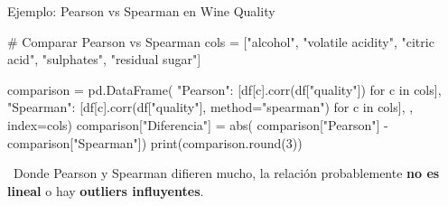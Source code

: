 \documentclass[aspectratio=169, 11pt]{beamer}
\begin{document}
\begin{frame}[fragile,shrink=28]{Ejemplo: Pearson vs Spearman en Wine Quality}
  \vspace{-6pt}
  \begin{pyblock}
# Comparar Pearson vs Spearman
cols = ["alcohol", "volatile acidity", "citric acid",
        "sulphates", "residual sugar"]

comparison = pd.DataFrame({
    "Pearson": [df[c].corr(df["quality"]) for c in cols],
    "Spearman": [df[c].corr(df["quality"],
                 method="spearman") for c in cols],
}, index=cols)
comparison["Diferencia"] = abs(
    comparison["Pearson"] - comparison["Spearman"])
print(comparison.round(3))
  \end{pyblock}

  \vspace{4pt}
  {\scriptsize\color{textMuted}
    \faLightbulb\ Donde Pearson y Spearman difieren mucho,
    la relación probablemente \textbf{no es lineal} o hay \textbf{outliers influyentes}.}
\end{frame}
\end{document}
